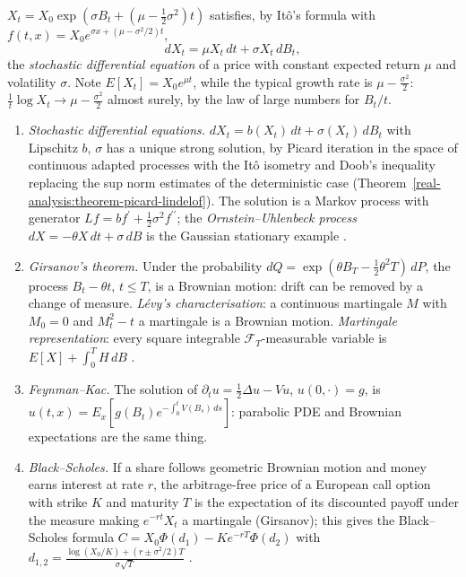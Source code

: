 \begin{example}\label{martingales:example-geometric-brownian}
$X_t = X_0\exp(\sigma B_t + (\mu - \frac12\sigma^2)t)$ satisfies, by It\^o's formula with $f(t, x) = X_0e^{\sigma x + (\mu - \sigma^2/2)t}$,
\[
dX_t = \mu X_t\,dt + \sigma X_t\,dB_t,
\]
the \emph{stochastic differential equation} of a price with constant expected return $\mu$ and volatility $\sigma$. Note $E[X_t] = X_0e^{\mu t}$, while the typical growth rate is $\mu - \frac{\sigma^2}{2}$: $\frac1t\log X_t \to \mu - \frac{\sigma^2}{2}$
almost surely, by the law of large numbers for $B_t/t$.
\end{example}

\begin{remark}\label{martingales:remark-stochastic-calculus}
\begin{enumerate}
\item \emph{Stochastic differential equations.} $dX_t = b(X_t)\,dt + \sigma(X_t)\,dB_t$ with Lipschitz $b$, $\sigma$ has a unique strong solution, by Picard iteration in the space of continuous adapted processes with the It\^o isometry and
Doob's inequality replacing the sup norm estimates of the deterministic case (Theorem~\ref{real-analysis:theorem-picard-lindelof}). The solution is a Markov process with generator $Lf = bf^{\prime} + \frac12\sigma^2f^{\prime\prime}$; the
\emph{Ornstein--Uhlenbeck process} $dX = -\theta X\,dt + \sigma\,dB$ is the Gaussian stationary example \cite{oksendal}.
\item \emph{Girsanov's theorem.} Under the probability $dQ = \exp(\theta B_T - \frac12\theta^2T)\,dP$, the process $B_t - \theta t$, $t \leq T$, is a Brownian motion: drift can be removed by a change of measure. \emph{L\'evy's
characterisation}: a continuous martingale $M$ with $M_0 = 0$ and $M_t^2 - t$ a martingale is a Brownian motion. \emph{Martingale representation}: every square integrable $\mathcal{F}_T$-measurable variable is
$E[X] + \int_0^TH\,dB$ \cite{revuz-yor}.
\item \emph{Feynman--Kac.} The solution of $\partial_tu = \frac12\Delta u - Vu$, $u(0, \cdot) = g$, is $u(t, x) = E_x[g(B_t)e^{-\int_0^tV(B_s)\,ds}]$: parabolic PDE and Brownian expectations are the same thing.
\item \emph{Black--Scholes.} If a share follows geometric Brownian motion and money earns interest at rate $r$, the arbitrage-free price of a European call option with strike $K$ and maturity $T$ is the expectation of its
discounted payoff under the measure making $e^{-rt}X_t$ a martingale (Girsanov); this gives the Black--Scholes formula
$C = X_0\Phi(d_1) - Ke^{-rT}\Phi(d_2)$ with $d_{1,2} = \frac{\log(X_0/K) + (r \pm \sigma^2/2)T}{\sigma\sqrt T}$ \cite{black-scholes-1973}.
\end{enumerate}
\end{remark}

